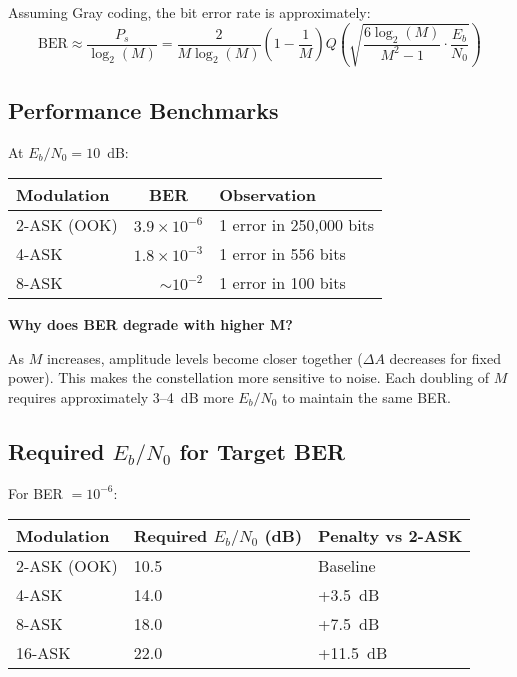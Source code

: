 Assuming Gray coding, the bit error rate is approximately:
\begin{equation}
\mathrm{BER} \approx \frac{P_s}{\log_2(M)} = \frac{2}{M\log_2(M)}\left(1 - \frac{1}{M}\right) Q\left(\sqrt{\frac{6\log_2(M)}{M^2 - 1} \cdot \frac{E_b}{N_0}}\right)
\end{equation}

\subsection{Performance Benchmarks}

At $E_b/N_0 = 10$~dB:

\begin{center}
\begin{tabular}{@{}lrl@{}}
\toprule
Modulation & \multicolumn{1}{c}{BER} & Observation \\
\midrule
2-ASK (OOK) & $3.9 \times 10^{-6}$ & 1 error in 250,000 bits \\
4-ASK & $1.8 \times 10^{-3}$ & 1 error in 556 bits \\
8-ASK & $\sim 10^{-2}$ & 1 error in 100 bits \\
\bottomrule
\end{tabular}
\end{center}

\begin{keyconcept}
\textbf{Why does BER degrade with higher M?}

As $M$ increases, amplitude levels become closer together ($\Delta A$ decreases for fixed power). This makes the constellation more sensitive to noise. Each doubling of $M$ requires approximately 3--4~dB more $E_b/N_0$ to maintain the same BER.
\end{keyconcept}

\subsection{Required $E_b/N_0$ for Target BER}

For BER $= 10^{-6}$:

\begin{center}
\begin{tabular}{@{}lll@{}}
\toprule
Modulation & Required $E_b/N_0$ (dB) & Penalty vs 2-ASK \\
\midrule
2-ASK (OOK) & 10.5 & Baseline \\
4-ASK & 14.0 & +3.5~dB \\
8-ASK & 18.0 & +7.5~dB \\
16-ASK & 22.0 & +11.5~dB \\
\bottomrule
\end{tabular}
\end{center}

